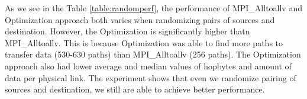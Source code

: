 
As we see in the Table \ref{table:randomperf}, the performance of MPI\_Alltoallv and Optimization approach both varies when randomizing pairs of sources and destination. However, the Optimization is significantly higher thatn MPI\_Alltoallv. This is because Optimization was able to find more paths to transfer data (530-630 paths) than MPI\_Alltoallv (256 paths). The Optimization approach also had lower average and median values of hopbytes and amount of data per physical link. The experiment shows that even we randomize pairing of sources and destination, we still are able to achieve better performance.
